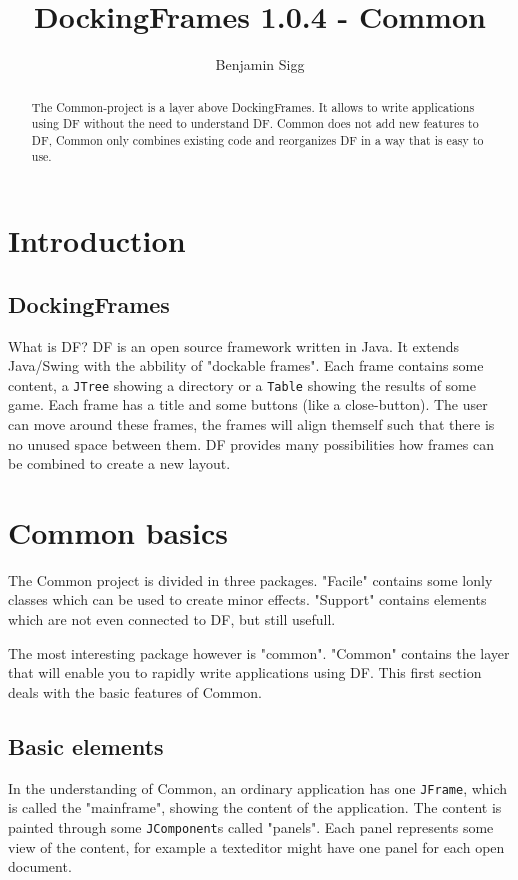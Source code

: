 \documentclass[a4paper,10pt]{article}
\title{DockingFrames 1.0.4 - Common}
\author{Benjamin Sigg}
\newcommand{\src}[1]{\lstinline[basicstyle=\ttfamily]|#1|}
\begin{document}
\maketitle
\tableofcontents
\newpage

\begin{abstract}
The Common-project is a layer above DockingFrames. It allows to write applications using DF without the need to understand DF. Common does not add new features to DF, Common only combines existing code and reorganizes DF in a way that is easy to use.
\end{abstract}

\section{Introduction}
\subsection{DockingFrames}
What is DF? DF is an open source framework written in Java. It extends Java/Swing with the abbility of "dockable frames". Each frame contains some content, a \src{JTree} showing a directory or a \src{Table} showing the results of some game. Each frame has a title and some buttons (like a close-button). The user can move around these frames, the frames will align themself such that there is no unused space between them. DF provides many possibilities how frames can be combined to create a new layout.

\section{Common basics}
The Common project is divided in three packages. "Facile" contains some lonly classes which can be used to create minor effects. "Support" contains elements which are not even connected to DF, but still usefull.

The most interesting package however is "common". "Common" contains the layer that will enable you to rapidly write applications using DF. This first section deals with the basic features of Common.

\subsection{Basic elements}
In the understanding of Common, an ordinary application has one \src{JFrame}, which is called the "mainframe", showing the content of the application. The content is painted through some \src{JComponent}s called "panels". Each panel represents some view of the content, for example a texteditor might have one panel for each open document.
\end{document}
